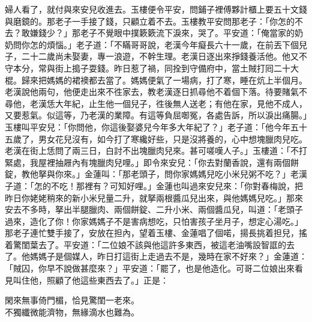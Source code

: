 婦人看了，就付與來安兒收進去。玉樓便令平安，問鋪子裡傅夥計櫃上要五十文錢與磨鏡的。那老子一手接了錢，只顧立着不去。玉樓教平安問那老子：「你怎的不去？敢嫌錢少？」那老子不覺眼中撲簌簌流下淚來，哭了。平安道：「俺當家的奶奶問你怎的煩惱。」老子道：「不瞞哥哥說，老漢今年癡長六十一歲，在前丟下個兒子，二十二歲尚未娶妻，專一浪遊，不幹生理。老漢日逐出來掙錢養活他。他又不守本分，常與街上搗子耍錢。昨日惹了禍，同拴到守備府中，當土賊打囘二十大棍。歸來把媽媽的裙襖都去當了。媽媽便氣了一場病，打了寒，睡在炕上半個月。老漢說他兩句，他便走出來不徃家去，教老漢逐日抓尋他不着個下落。待要賭氣不尋他，老漢恁大年紀，止生他一個兒子，徃後無人送老；有他在家，見他不成人，又要惹氣。似這等，乃老漢的業障。有這等負屈啣冤，各處告訴，所以淚出痛腸。」玉樓叫平安兒：「你問他，你這後娶婆兒今年多大年紀了？」老子道：「他今年五十五歲了，男女花兒沒有，如今打了寒纔好些，只是沒將養的，心中想塊臘肉兒吃。老漢在街上恁問了兩三日，白討不出塊臘肉兒來。甚可嗟嘆人子。」玉樓道：「不打緊處，我屋裡抽屜內有塊臘肉兒哩。」即令來安兒：「你去對蘭香說，還有兩個餅錠，教他拏與你來。」金蓮叫：「那老頭子，問你家媽媽兒吃小米兒粥不吃？」老漢子道：「怎的不吃！那裡有？可知好哩。」金蓮也叫過來安兒來：「你對春梅說，把昨日你姥姥稍來的新小米兒量二升，就拏兩根醬瓜兒出來，與他媽媽兒吃。」那來安去不多時，拏出半腿臘肉、兩個餅錠、二升小米、兩個醬瓜兒，叫道：「老頭子過來，造化了你！你家媽媽子不是害病想吃，只怕害孩子坐月子，想定心湯吃。」那老子連忙雙手接了，安放在担內，望着玉樓、金蓮唱了個喏，揚長挑着担兒，搖着驚閨葉去了。平安道：「二位娘不該與他這許多東西，被這老油嘴設智誆的去了。他媽媽子是個媒人，昨日打這街上走過去不是，幾時在家不好來？」金蓮道：「賊囚，你早不說做甚麼來？」平安道：「罷了，也是他造化。可哥二位娘出來看見叫住他，照顧了他這些東西去了。」正是：

\begin{myquote} 
閑來無事倚門楣，恰見驚閨一老來。\\不獨纖微能濟物，無緣滴水也難為。
\end{myquote} 

